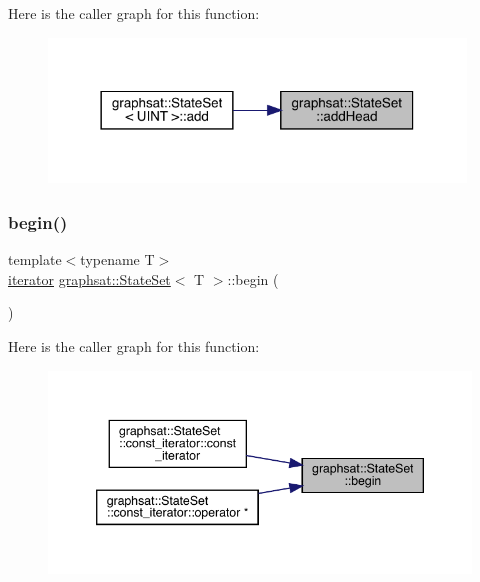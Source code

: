 Here is the caller graph for this function\+:
\nopagebreak
\begin{figure}[H]
\begin{center}
\leavevmode
\includegraphics[width=314pt]{classgraphsat_1_1_state_set_a3d7046e995575e5bf9806b174ec75a65_icgraph}
\end{center}
\end{figure}
\mbox{\label{classgraphsat_1_1_state_set_ad5f5221dbe778039f0aed6404d3c34d8}} 
\subsubsection{\texorpdfstring{begin()}{begin()}\hspace{0.1cm}{\footnotesize\ttfamily [1/2]}}
{\footnotesize\ttfamily template$<$typename T$>$ \\
\mbox{\hyperlink{classgraphsat_1_1_state_set_1_1iterator}{iterator}} \mbox{\hyperlink{classgraphsat_1_1_state_set}{graphsat\+::\+State\+Set}}$<$ T $>$\+::begin (\begin{DoxyParamCaption}{ }\end{DoxyParamCaption})\hspace{0.3cm}{\ttfamily [inline]}}

Here is the caller graph for this function\+:
\nopagebreak
\begin{figure}[H]
\begin{center}
\leavevmode
\includegraphics[width=346pt]{classgraphsat_1_1_state_set_ad5f5221dbe778039f0aed6404d3c34d8_icgraph}
\end{center}
\end{figure}
\mbox{\label{classgraphsat_1_1_state_set_a38ce7b2f5e1c5153621361420935aa54}} 
